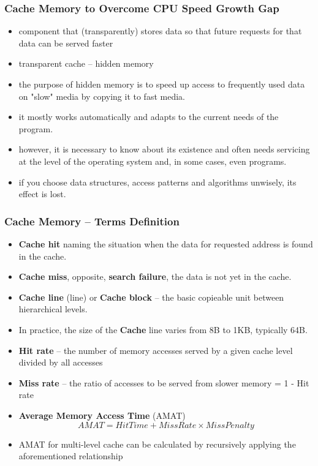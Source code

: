 \documentclass{beamer}
\begin{document}
\begin{frame}
\frametitle{Cache Memory to Overcome CPU Speed Growth Gap}

\begin{itemize}
\item component that (transparently) stores data so that future requests for that data can be served faster
\item transparent cache – hidden memory
\item the purpose of hidden memory is to speed up access to frequently used data on "slow" media by copying it to fast media.
\item it mostly works automatically and adapts to the current needs of the program.
\item however, it is necessary to know about its existence and often needs servicing at the level of the operating system and, in some cases, even programs.
\item if you choose data structures, access patterns and algorithms unwisely, its effect is lost.
\end{itemize}

\end{frame}

\begin{frame}[shrink=1]
\frametitle{Cache Memory -- Terms Definition}

\begin{itemize}
\item \textbf{Cache hit} naming the situation when the data for requested address is found in the cache.
\item \textbf{Cache miss}, opposite, \textbf{search failure}, the data is not yet in the cache.
\item \textbf{Cache line} (line) or \textbf{Cache block} – the basic copieable unit between hierarchical levels.
\item In practice, the size of the \textbf{Cache} line varies from 8B to 1KB, typically 64B.
\item \textbf{Hit rate} -- the number of memory accesses served by a given cache level divided by all accesses
\item \textbf{Miss rate} -- the ratio of accesses to be served from slower memory = 1 - Hit rate
\item \textbf{Average Memory Access Time} (AMAT) $$AMAT = Hit Time + Miss Rate \times Miss Penalty$$
\item AMAT for multi-level cache can be calculated by recursively applying the aforementioned relationship
\end{itemize}

\end{frame}
\end{document}
